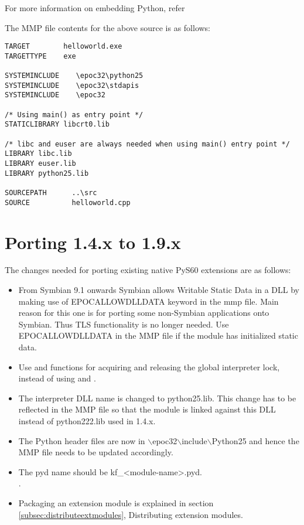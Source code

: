 For more information on embedding Python, refer 

The MMP file contents for the above source is as follows:

\begin{verbatim}
TARGET        helloworld.exe
TARGETTYPE    exe

SYSTEMINCLUDE    \epoc32\python25
SYSTEMINCLUDE    \epoc32\stdapis
SYSTEMINCLUDE    \epoc32

/* Using main() as entry point */
STATICLIBRARY libcrt0.lib

/* libc and euser are always needed when using main() entry point */
LIBRARY libc.lib
LIBRARY euser.lib
LIBRARY python25.lib

SOURCEPATH      ..\src
SOURCE          helloworld.cpp

\end{verbatim}

\section{Porting 1.4.x to 1.9.x}
\label{sec:porting}
The changes needed for porting existing native PyS60 extensions are as follows:

\begin{itemize}
\item From Symbian 9.1 onwards Symbian allows Writable Static Data in a DLL
      by making use of EPOCALLOWDLLDATA keyword in the mmp file. Main reason for
      this one is for porting some non-Symbian applications onto Symbian. Thus
      TLS functionality is no longer needed. Use EPOCALLOWDLLDATA in the MMP file
      if the module has initialized static data.

\item Use  and  functions for acquiring and
      releasing the global interpreter lock, instead of using
       and
      .

\item The interpreter DLL name is changed to python25.lib. This change has to be reflected in the MMP file
      so that the module is linked against this DLL instead of python222.lib used in 1.4.x.

\item The Python header files are now in $\backslash$epoc32$\backslash$include$\backslash$Python25 and hence
      the MMP file needs to be updated accordingly.
\item The pyd name should be kf_<module-name>.pyd.\\
.

\item Packaging an extension module is explained in section \ref{subsec:distributeextmodules}, Distributing extension modules.

\end{itemize}

